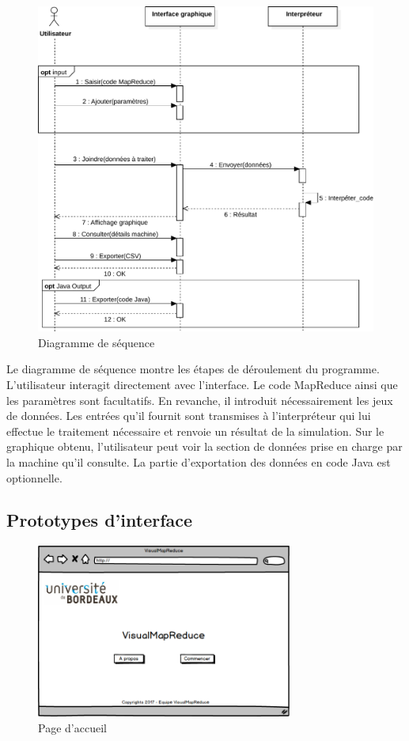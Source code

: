 \documentclass[12pt,a4paper]{article}
\begin{document}
\begin{figure}[H]
  \centering
    \includegraphics[width=1\textwidth]{images/SequenceDiagram.pdf}
	\caption{Diagramme de séquence}
\end{figure}

Le diagramme de séquence montre les étapes de déroulement du programme. L'utilisateur interagit directement avec l'interface. Le code MapReduce ainsi que les paramètres sont facultatifs. En revanche, il introduit nécessairement les jeux de données.
Les entrées qu'il fournit sont transmises à l'interpréteur qui lui effectue le traitement nécessaire et renvoie un résultat de la simulation. Sur le graphique obtenu, l'utilisateur peut voir la section de données prise en charge par la machine qu'il consulte. La partie d'exportation des données en code Java est optionnelle.


\subsection{Prototypes d'interface}\label{prototypes-interface}
\begin{figure}[H]
  \centering
    \includegraphics[width=0.75\textwidth]{images/interface/page_accueil.png}
    \caption{Page d'accueil}
\end{figure}
\end{document}
